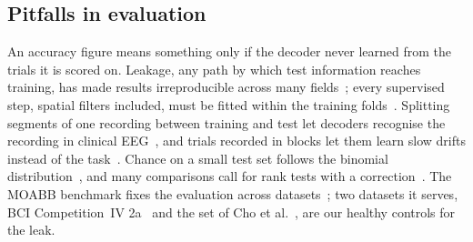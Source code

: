 \subsection{Pitfalls in evaluation}
An accuracy figure means something only if the decoder never learned from the trials it is
scored on. Leakage, any path by which test information reaches training, has made results
irreproducible across many fields~\cite{kapoor2023}; every supervised step, spatial filters
included, must be fitted within the training folds~\cite{varoquaux2017,lemm2011}. Splitting
segments of one recording between training and test let decoders recognise the recording in
clinical EEG~\cite{brookshire2024}, and trials recorded in blocks let them learn slow drifts
instead of the task~\cite{li2021perils}. Chance on a small test set follows the binomial
distribution~\cite{combrisson2015}, and many comparisons call for rank tests with a
correction~\cite{demsar2006}. The MOABB benchmark fixes the evaluation across
datasets~\cite{jayaram2018moabb,chevallier2024moabb}; two datasets it serves, BCI Competition~IV
2a~\cite{tangermann2012} and the set of Cho et al.~\cite{cho2017}, are our healthy controls for
the leak.

